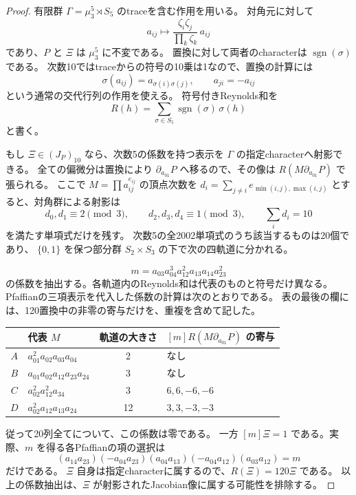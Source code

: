 \begin{proof}
有限群 $\Gamma=\mu_3^5\rtimes S_5$ のtraceを含む作用を用いる。
対角元に対して
\[
 a_{ij}\longmapsto
       \frac{\zeta_i\zeta_j}{\prod_k\zeta_k}\,a_{ij}
\]
であり、$P$ と $\Xi$ は $\mu_3^5$ に不変である。
置換に対して両者のcharacterは $\operatorname{sgn}(\sigma)$ である。
次数10ではtraceからの符号の10乗は1なので、置換の計算には
\[
 \sigma(a_{ij})=a_{\sigma(i)\sigma(j)},\qquad a_{ji}=-a_{ij}
\]
という通常の交代行列の作用を使える。
符号付きReynolds和を
\[
                 R(h)=\sum_{\sigma\in S_5}
                          \operatorname{sgn}(\sigma)\,\sigma(h)
\]
と書く。

もし $\Xi\in(J_P)_{10}$ なら、次数5の係数を持つ表示を
$\Gamma$ の指定characterへ射影できる。
全ての偏微分は置換により $\partial_{a_{01}}P$ へ移るので、その像は
$R(M\partial_{a_{01}}P)$ で張られる。
ここで $M=\prod a_{ij}^{e_{ij}}$ の頂点次数を
$d_i=\sum_{j\ne i}e_{\min(i,j),\max(i,j)}$ とすると、対角群による射影は
\[
 d_0,d_1\equiv2\pmod3,\qquad d_2,d_3,d_4\equiv1\pmod3,
 \qquad \sum_i d_i=10
\]
を満たす単項式だけを残す。
次数5の全2002単項式のうち該当するものは20個であり、
$\{0,1\}$ を保つ部分群 $S_2\times S_3$ の下で次の四軌道に分かれる。

\[
                         m=a_{03}a_{04}^3a_{12}^2a_{13}a_{14}a_{23}^2
\]
の係数を抽出する。各軌道内のReynolds和は代表のものと符号だけ異なる。
Pfaffianの三項表示を代入した係数の計算は次のとおりである。
表の最後の欄には、120置換中の非零の寄与だけを、重複を含めて記した。

\begin{center}
\begin{tabular}{@{}clcl@{}}
\toprule
 & 代表 $M$ & 軌道の大きさ & $[m]R(M\partial_{a_{01}}P)$ の寄与\\
\midrule
$A$ & $a_{01}^2a_{02}a_{03}a_{04}$ & 2 & なし\\
$B$ & $a_{01}a_{02}a_{12}a_{23}a_{24}$ & 3 & なし\\
$C$ & $a_{02}^2a_{12}^2a_{34}$ & 3 & $6,6,-6,-6$\\
$D$ & $a_{02}^2a_{12}a_{13}a_{24}$ & 12 & $3,3,-3,-3$\\
\bottomrule
\end{tabular}
\end{center}

従って20列全てについて、この係数は零である。
一方 $[m]\Xi=1$ である。実際、$m$ を得る各Pfaffianの項の選択は
\[
 (a_{14}a_{23})(-a_{04}a_{23})(a_{04}a_{13})
                 (-a_{04}a_{12})(a_{03}a_{12})=m
\]
だけである。
$\Xi$ 自身は指定characterに属するので、$R(\Xi)=120\Xi$ である。
以上の係数抽出は、$\Xi$ が射影されたJacobian像に属する可能性を排除する。


\end{proof}

